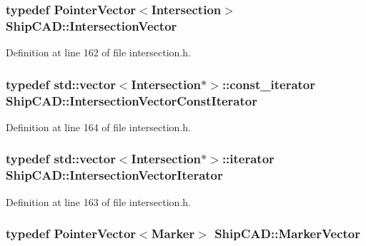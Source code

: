\subsubsection[{\texorpdfstring{Intersection\+Vector}{IntersectionVector}}]{\setlength{\rightskip}{0pt plus 5cm}typedef {\bf Pointer\+Vector}$<${\bf Intersection}$>$ {\bf Ship\+C\+A\+D\+::\+Intersection\+Vector}}\hypertarget{namespaceShipCAD_a9910f0963197f9df6125398efd4fa139}{}\label{namespaceShipCAD_a9910f0963197f9df6125398efd4fa139}


Definition at line 162 of file intersection.\+h.

\subsubsection[{\texorpdfstring{Intersection\+Vector\+Const\+Iterator}{IntersectionVectorConstIterator}}]{\setlength{\rightskip}{0pt plus 5cm}typedef std\+::vector$<${\bf Intersection}$\ast$$>$\+::const\+\_\+iterator {\bf Ship\+C\+A\+D\+::\+Intersection\+Vector\+Const\+Iterator}}\hypertarget{namespaceShipCAD_a354810638f1643d04b62af2d08fd21bd}{}\label{namespaceShipCAD_a354810638f1643d04b62af2d08fd21bd}


Definition at line 164 of file intersection.\+h.

\subsubsection[{\texorpdfstring{Intersection\+Vector\+Iterator}{IntersectionVectorIterator}}]{\setlength{\rightskip}{0pt plus 5cm}typedef std\+::vector$<${\bf Intersection}$\ast$$>$\+::iterator {\bf Ship\+C\+A\+D\+::\+Intersection\+Vector\+Iterator}}\hypertarget{namespaceShipCAD_af8171e2e69ad8453d540aa87b159ad75}{}\label{namespaceShipCAD_af8171e2e69ad8453d540aa87b159ad75}


Definition at line 163 of file intersection.\+h.

\subsubsection[{\texorpdfstring{Marker\+Vector}{MarkerVector}}]{\setlength{\rightskip}{0pt plus 5cm}typedef {\bf Pointer\+Vector}$<${\bf Marker}$>$ {\bf Ship\+C\+A\+D\+::\+Marker\+Vector}}\hypertarget{namespaceShipCAD_a36fff5b53986f6d6976afc749463ef22}{}\label{namespaceShipCAD_a36fff5b53986f6d6976afc749463ef22}


